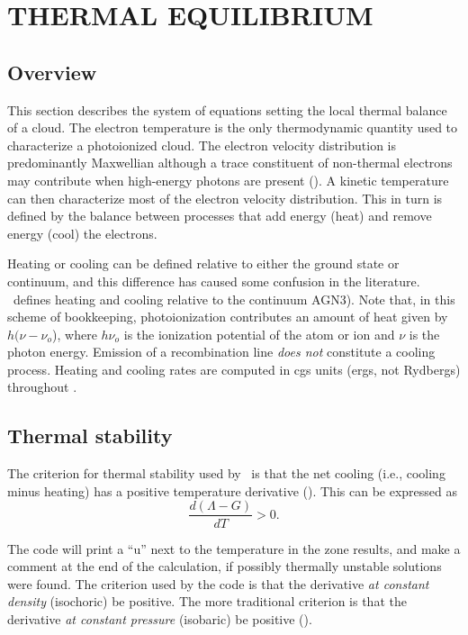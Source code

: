 \chapter{THERMAL EQUILIBRIUM}

\section{Overview}

This section describes the system of equations setting the local thermal
balance of a cloud.  The electron temperature is the only thermodynamic
quantity used to characterize a photoionized cloud.  The electron velocity
distribution is predominantly Maxwellian \citep{Bohm1947} although
a trace constituent of non-thermal electrons may contribute when high-energy
photons are present (\citealp{Spitzer1968}).  A kinetic temperature can
then characterize most of the electron velocity distribution.  This in turn
is defined by the balance between processes that add energy (heat) and remove
energy (cool) the electrons.

Heating or cooling can be defined relative to either the ground state
or continuum, and this difference has caused some confusion in the
literature.  \Cloudy\ defines heating and cooling relative to the continuum AGN3).
Note that, in this scheme of bookkeeping,
photoionization contributes an amount of heat given by $h(\nu-\nu_o$),
where $h\nu_o$
is the ionization potential of the atom or ion and $\nu$ is the photon energy.
Emission of a recombination line \emph{does not} constitute a cooling process.
Heating and cooling rates are computed in cgs units (ergs, not Rydbergs)
throughout \Cloudy.

\section{Thermal stability}

The criterion for thermal stability used by \Cloudy\ is that the net cooling
(i.e., cooling minus heating) has a positive temperature derivative (\citealp{Field1965}).  This can be expressed as
\begin{equation}
\label{eqn:ThermalStability}
\frac{{d\left( {\Lambda  - G} \right)}}{{dT}} > 0.%
\end{equation}

The code will print a ``u'' next to the temperature in the zone results,
and make a comment at the end of the calculation, if possibly thermally
unstable solutions were found. The criterion used by the code is that the
derivative \emph{at constant density} (isochoric) be positive.  The more traditional
criterion is that the derivative \emph{at constant pressure} (isobaric) be positive
(\citealp{Field1965}).

